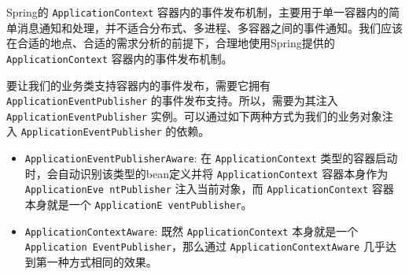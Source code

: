 Spring的 \texttt{ApplicationContext} 容器内的事件发布机制，主要用于单一容器内的简单消息通知和处理，并不适合分布式、多进程、多容器之间的事件通知。我们应该在合适的地点、合适的需求分析的前提下，合理地使用Spring提供的 \texttt{ApplicationContext} 容器内的事件发布机制。

要让我们的业务类支持容器内的事件发布，需要它拥有 \texttt{ApplicationEventPublisher} 的事件发布支持。所以，需要为其注入 \texttt{ApplicationEventPublisher} 实例。可以通过如下两种方式为我们的业务对象注入 \texttt{ApplicationEventPublisher} 的依赖。

\begin{itemize}
    \item \texttt{ApplicationEventPublisherAware}: 在 \texttt{ApplicationContext} 类型的容器启动时，会自动识别该类型的bean定义并将 \texttt{ApplicationContext} 容器本身作为 \texttt{ApplicationEve ntPublisher} 注入当前对象，而 \texttt{ApplicationContext} 容器本身就是一个 \texttt{ApplicationE ventPublisher}。
    \item \texttt{ApplicationContextAware}: 既然 \texttt{ApplicationContext} 本身就是一个 \texttt{Application EventPublisher}，那么通过 \texttt{ApplicationContextAware} 几乎达到第一种方式相同的效果。
\end{itemize}